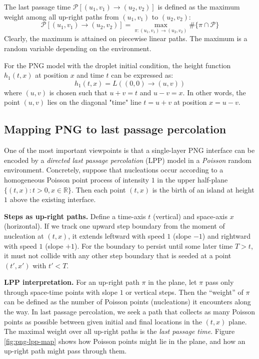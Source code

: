 \documentclass[letterpaper,11pt,oneside,reqno]{article}
\numberwithin{equation}{section}
\theoremstyle{definition}
\begin{document}
The last passage time $\mathcal{P}[(u_1, v_1) \to (u_2, v_2)]$ is defined as the maximum weight among all up-right paths from $(u_1, v_1)$ to $(u_2, v_2)$:
\begin{equation*}
\mathcal{P}[(u_1, v_1) \to (u_2, v_2)] = \max_{\pi: (u_1, v_1) \to (u_2, v_2)} \#\{\pi \cap \mathcal{P}\}
\end{equation*}
Clearly, the maximum is attained on piecewise linear paths. The maximum is a random variable
depending on the environment.

For the PNG model with the droplet initial condition, the height function $h_1(t,x)$ at position $x$ and time $t$ can be expressed as:
\begin{equation*}
h_1(t,x) = L((0,0) \to (u,v))
\end{equation*}
where $(u,v)$ is chosen such that $u + v = t$ and $u - v = x$. In other words, the point $(u,v)$ lies on the diagonal "time" line $t = u + v$ at position $x = u - v$.




\newpage
\subsection{Mapping PNG to last passage percolation}
\label{sub:PNG-LPP-connection}
One of the most important viewpoints is that a single-layer PNG interface can be encoded by a \emph{directed last passage percolation} (LPP) model in a \emph{Poisson} random environment. Concretely, suppose that nucleations occur according to a homogeneous Poisson point process of intensity $1$ in the upper half-plane $\{(t,x):t>0,x\in\mathbb{R}\}$. Then each point $(t,x)$ is the birth of an island at height $1$ above the existing interface.

\smallskip

\noindent\textbf{Steps as up-right paths.} Define a time-axis $t$ (vertical) and space-axis $x$ (horizontal). If we track one upward step boundary from the moment of nucleation at $(t,x)$, it extends leftward with speed $1$ (slope $-1$) and rightward with speed $1$ (slope $+1$). For the boundary to persist until some later time $T>t$, it must not collide with any other step boundary that is seeded at a point $(t',x')$ with $t'<T$.

\smallskip

\noindent\textbf{LPP interpretation.} For an up-right path $\pi$ in the plane, let $\pi$ pass only through space-time points with slope $1$ or vertical steps. Then the ``weight'' of $\pi$ can be defined as the number of Poisson points (nucleations) it encounters along the way. In last passage percolation, we seek a path that collects as many Poisson points as possible between given initial and final locations in the $(t,x)$ plane. The maximal weight over all up-right paths is the \emph{last passage time}. Figure \ref{fig:png-lpp-map} shows how Poisson points might lie in the plane, and how an up-right path might pass through them.
\end{document}
